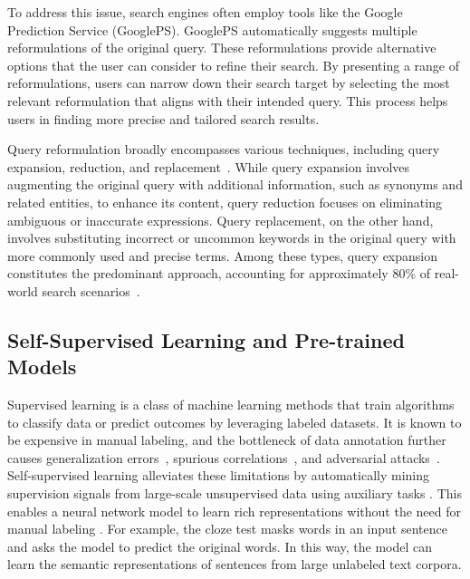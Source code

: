 \documentclass[sigconf,screen]{acmart}
\newcommand{\eg}{\hbox{e.g.}\xspace}
\begin{document}
To address this issue, search engines often employ tools like the Google Prediction Service (GooglePS). GooglePS automatically suggests multiple reformulations of the original query. These reformulations provide alternative options that the user can consider to refine their search. By presenting a range of reformulations, users can narrow down their search target by selecting the most relevant reformulation that aligns with their intended query. This process helps users in finding more precise and tailored search results.


Query reformulation broadly encompasses various techniques, including query expansion, reduction, and replacement~\cite{jansen2009patterns}. While query expansion involves augmenting the original query with additional information, such as synonyms and related entities, to enhance its content, query reduction focuses on eliminating ambiguous or inaccurate expressions. Query replacement, on the other hand, involves substituting incorrect or uncommon keywords in the original query with more commonly used and precise terms. Among these types, query expansion constitutes the predominant approach, accounting for approximately 80\% of real-world search scenarios~\cite{sadowski2015developers}.




\subsection{Self-Supervised Learning and Pre-trained Models}

Supervised learning is a class of machine learning methods that train algorithms to classify data or predict outcomes by leveraging labeled datasets.
It is known to be expensive in manual labeling, and the bottleneck of data annotation further causes generalization errors~\cite{jakubovitz2019generalization}, spurious correlations~\cite{kronmal1993spurious}, and adversarial attacks~\cite{madry2017towards}. 
Self-supervised learning alleviates these limitations by automatically mining supervision signals from large-scale unsupervised data using auxiliary tasks \cite{Self-supervised-Learning}. This enables a neural network model to learn rich representations without the need for manual labeling \cite{Yang0S22}. For example, the cloze test masks words in an input sentence and asks the model to predict the original words. In this way, the model can learn the semantic representations of sentences from large unlabeled text corpora. 
\end{document}
